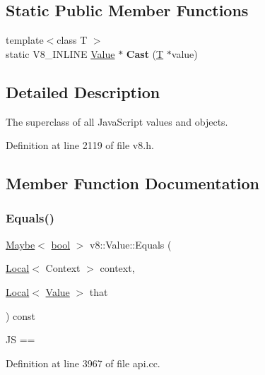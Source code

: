\subsection*{Static Public Member Functions}
\begin{DoxyCompactItemize}
\item 
\mbox{\label{classv8_1_1Value_ae5aa9b54ebed55819c3a4b2a3eb5fe12}} 
{\footnotesize template$<$class T $>$ }\\static V8\+\_\+\+I\+N\+L\+I\+NE \mbox{\hyperlink{classv8_1_1Value}{Value}} $\ast$ {\bfseries Cast} (\mbox{\hyperlink{classv8_1_1internal_1_1torque_1_1T}{T}} $\ast$value)
\end{DoxyCompactItemize}


\subsection{Detailed Description}
The superclass of all Java\+Script values and objects. 

Definition at line 2119 of file v8.\+h.



\subsection{Member Function Documentation}
\mbox{\label{classv8_1_1Value_aaf9e18e3d2ca581d89deec43ec852f46}} 
\subsubsection{\texorpdfstring{Equals()}{Equals()}}
{\footnotesize\ttfamily \mbox{\hyperlink{classv8_1_1Maybe}{Maybe}}$<$ \mbox{\hyperlink{classbool}{bool}} $>$ v8\+::\+Value\+::\+Equals (\begin{DoxyParamCaption}\item[{\mbox{\hyperlink{classv8_1_1Local}{Local}}$<$ Context $>$}]{context,  }\item[{\mbox{\hyperlink{classv8_1_1Local}{Local}}$<$ \mbox{\hyperlink{classv8_1_1Value}{Value}} $>$}]{that }\end{DoxyParamCaption}) const}

JS == 

Definition at line 3967 of file api.\+cc.

\mbox{\label{classv8_1_1Value_addd71e0247ca7e8055dafdf196542b0b}} 
